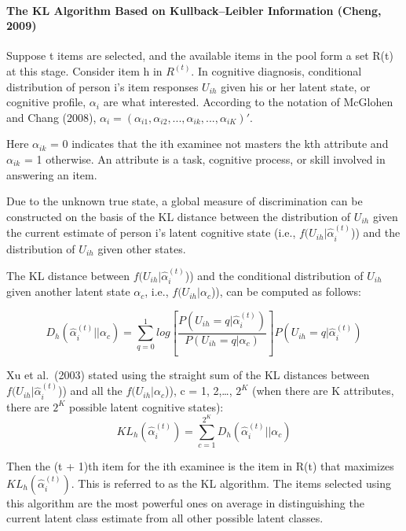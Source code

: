 \documentclass[
]{article}
\begin{document}
\hypertarget{the-kl-algorithm-based-on-kullbackleibler-information-cheng-2009}{%
\paragraph{The KL Algorithm Based on Kullback--Leibler Information
(Cheng,
2009)}\label{the-kl-algorithm-based-on-kullbackleibler-information-cheng-2009}}

Suppose t items are selected, and the available items in the pool form a
set R(t) at this stage. Consider item h in \(R^{(t)}\). In cognitive
diagnosis, conditional distribution of person i's item responses
\(U_{ih}\) given his or her latent state, or cognitive profile,
\(\alpha_i\) are what interested. According to the notation of McGlohen
and Chang (2008),
\(\alpha_{i}=(\alpha_{i1},\alpha_{i2},...,\alpha_{ik},...,\alpha_{iK})'\).

Here \(\alpha_{ik}\) = 0 indicates that the ith examinee not masters the
kth attribute and \(\alpha_{ik}\) = 1 otherwise. An attribute is a task,
cognitive process, or skill involved in answering an item.

Due to the unknown true state, a global measure of discrimination can be
constructed on the basis of the KL distance between the distribution of
\(U_{ih}\) given the current estimate of person i's latent cognitive
state (i.e., \(f(U_{ih}|\hat \alpha_i^{(t)}\))) and the distribution of
\(U_{ih}\) given other states.

The KL distance between \(f(U_{ih}|\hat \alpha_i^{(t)}\))) and the
conditional distribution of \(U_{ih}\) given another latent state
\(\alpha_c\), i.e., \(f(U_{ih}|\alpha_c\))), can be computed as follows:

\[D_h(\hat \alpha_i^{(t)}||\alpha_c)=\sum_{q=0}^1log[\frac{P(U_{ih}=q|\hat \alpha_i^{(t)})}{P(U_{ih}=q|\alpha_c)}]P(U_{ih}=q|\hat \alpha_i^{(t)})\]

Xu et al.~(2003) stated using the straight sum of the KL distances
between \(f(U_{ih}|\hat \alpha_i^{(t)}\))) and all the
\(f(U_{ih}|\alpha_c\))), c = 1, 2,\ldots, \(2^K\) (when there are K
attributes, there are \(2^K\) possible latent cognitive states):
\[KL_h(\hat \alpha_i^{(t)})=\sum _{c=1}^{2^K}D_h(\hat \alpha_i^{(t)}||\alpha_c)\]

Then the (t + 1)th item for the ith examinee is the item in R(t) that
maximizes \(KL_h(\hat \alpha_i^{(t)})\). This is referred to as the KL
algorithm. The items selected using this algorithm are the most powerful
ones on average in distinguishing the current latent class estimate from
all other possible latent classes.
\end{document}
